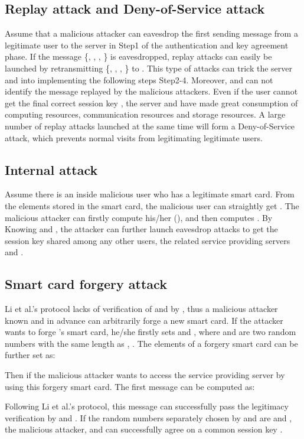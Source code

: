 \documentclass[preprint,12pt]{elsarticle}
\begin{document}
\subsection{Replay attack and Deny-of-Service attack}
Assume that a malicious attacker can eavesdrop the first sending message from a legitimate user to the server  in Step1 of the authentication and key agreement phase. If the message \{, , , \} is eavesdropped,  replay attacks can easily be launched by retransmitting \{, , , \} to . This type of attacks can trick the server  and  into implementing the following steps Step2-4. Moreover,  and  can not identify the message replayed by the malicious attackers. Even if the user cannot get the final correct session key , the server  and  have made great consumption of computing resources, communication resources and storage resources. A large number of replay attacks launched at the same time will form a Deny-of-Service attack, which prevents normal visits from legitimating legitimate users.

\subsection{Internal attack}
Assume there is an inside malicious user who has a legitimate smart card. From the elements stored in the smart card, the malicious user can straightly get . The malicious attacker  can firstly compute his/her (), and then computes . By Knowing  and , the attacker can further launch eavesdrop attacks to get the session key shared among any other users, the related service providing servers and .

\subsection{Smart card forgery attack}
Li et al.'s protocol lacks of verification of  and  by , thus a malicious attacker known  and  in advance can arbitrarily forge a new smart card. If the attacker wants to forge 's smart card, he/she firstly sets  and , where  and  are two random numbers with the same length as , . The elements of a forgery smart card can be further set as:


Then if the malicious attacker wants to access the service providing server  by using this forgery smart card. The first message can be computed as:


Following Li et al.'s protocol, this message can successfully pass the legitimacy verification by  and . If the random numbers separately chosen by  and  are  and , the malicious attacker,  and  can successfully agree on a common session key .
\end{document}
